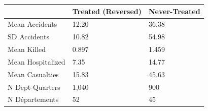 \begin{tabular}[t]{lll}
\toprule
  & Treated (Reversed) & Never-Treated\\
\midrule
Mean Accidents & 12.20 & 36.38\\
SD Accidents & 10.82 & 54.98\\
Mean Killed & 0.897 & 1.459\\
Mean Hospitalized & 7.35 & 14.77\\
Mean Casualties & 15.83 & 45.63\\
\addlinespace
N Dept-Quarters & 1,040 & 900\\
N D\'{e}partements & 52 & 45\\
\bottomrule
\end{tabular}
